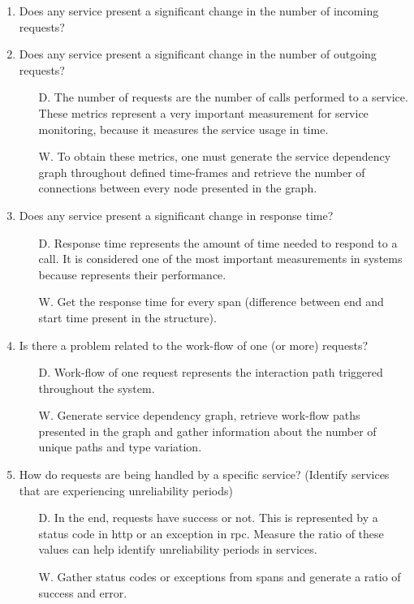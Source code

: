 \begin{enumerate}
    \item Does any service present a significant change in the number of incoming requests?
    \item Does any service present a significant change in the number of outgoing requests?
          \begin{itemize}
              \item[D.] The number of requests are the number of calls performed to a service. These metrics represent a very important measurement for service monitoring, because it measures the service usage in time.
              \item[W.] To obtain these metrics, one must generate the service dependency graph throughout defined time-frames and retrieve the number of connections between every node presented in the graph.
          \end{itemize}

    \item Does any service present a significant change in response time?
          \begin{itemize}
              \item[D.] Response time represents the amount of time needed to respond to a call. It is considered one of the most important measurements in systems because represents their performance.
              \item[W.] Get the response time for every span (difference between end and start time present in the structure).
          \end{itemize}

    \item Is there a problem related to the work-flow of one (or more) requests?
          \begin{itemize}
              \item[D.] Work-flow of one request represents the interaction path triggered throughout the system.
              \item[W.] Generate service dependency graph, retrieve work-flow paths presented in the graph and gather information about the number of unique paths and type variation.
          \end{itemize}

    \item How do requests are being handled by a specific service? (Identify services that are experiencing unreliability periods)
          \begin{itemize}
              \item[D.] In the end, requests have success or not. This is represented by a status code in \gls{http} or an exception in \gls{rpc}. Measure the ratio of these values can help identify unreliability periods in services.
              \item[W.] Gather status codes or exceptions from spans and generate a ratio of success and error.
          \end{itemize}


\end{enumerate}
